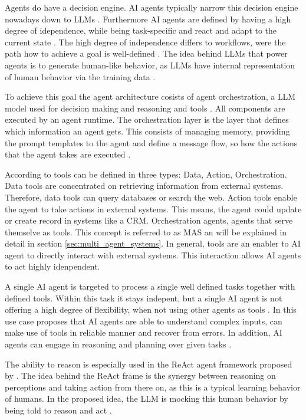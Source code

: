 \documentclass[a4paper,oneside,bibliography=totoc]{scrbook}
\begin{document}
Agents do have a decision engine. \ac{AI} agents typically narrow this decision engine nowadays down to \acp{LLM} \cite{Sapkota2025,Park2023}. Furthermore \ac{AI} agents are defined by having a high degree of idependence, while being task-specific and react and adapt to the current state \cite{Sapkota2025,OpenAI2025}. The high degree of independence differs to workflows, were the path how to achieve a goal is well-defined \cite{Anthropic2024}. The idea behind \acp{LLM} that power agents is to generate human-like behavior, as \acp{LLM} have internal representation of human behavior via the training data \cite{Park2023}.

To achieve this goal the agent architecture cosists of agent orchestration, a \ac{LLM} model used for decision making and reasoning and tools \cite{Wiesinger2025,OpenAI2025}. All components are executed by an agent runtime. The orchestration layer is the layer that defines which information an agent gets. This consists of managing memory, providing the prompt templates to the agent and define a message flow, so how the actions that the agent takes are executed \cite{Wiesinger2025}.

According to \citet{OpenAI2025} tools can be defined in three types: Data, Action, Orchestration. Data tools are concentrated on retrieving information from external systems. Therefore, data tools can query databases or search the web. Action tools enable the agent to take actions in external systems. This means, the agent could update or create record in systems like a \ac{CRM}. Orchestration agents, agents that serve themselve as tools. This concept is referred to as \ac{MAS} an will be explained in detail in section \ref{sec:multi_agent_systems}. In general, tools are an enabler to AI agent to directly interact with external systems. This interaction allows \ac{AI} agents to act highly idenpendent.

A single \ac{AI} agent is targeted to process a single well defined tasks together with defined tools. Within this task it stays indepent, but a single \ac{AI} agent is not offering a high degree of flexibility, when not using other agents as tools \cite{Sapkota2025}. In this use case \citet{Anthropic2024} proposes that \ac{AI} agents are able to understand complex inputs, can make use of tools in reliable manner and recover from errors. In addition, \ac{AI} agents can engage in reasoning and planning over given tasks \cite{Anthropic2024}.

The ability to reason is especially used in the ReAct agent framework proposed by \citet{Yao2023}. The idea behind the ReAct frame is the synergy between reasoning on perceptions and taking action from there on, as this is a typical learning behavior of humans. In the proposed idea, the \ac{LLM} is mocking this human behavior by being told to reason and act \cite{Yao2023}.
\end{document}
